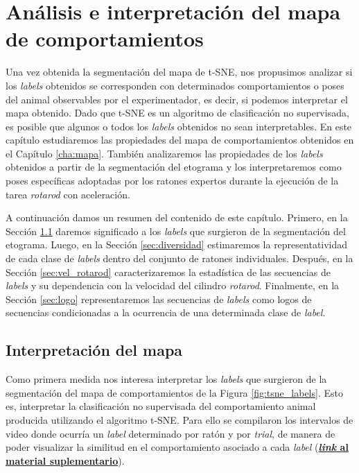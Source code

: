 \chapter{Análisis e interpretación del mapa de comportamientos}\label{cha:labels}

Una vez obtenida la segmentación del mapa de t-SNE, nos propusimos analizar si los \textit{labels} obtenidos se corresponden con determinados comportamientos o poses del animal observables por el experimentador, es decir, si podemos interpretar el mapa obtenido. Dado que t-SNE es un algoritmo de clasificación no supervisada, es posible que algunos o todos los \textit{labels} obtenidos no sean interpretables. En este capítulo estudiaremos las propiedades del mapa de comportamientos obtenidos en el Capítulo \ref{cha:mapa}. También analizaremos las propiedades de los \textit{labels} obtenidos a partir de la segmentación del etograma y los interpretaremos como poses específicas adoptadas por los ratones expertos durante la ejecución de la tarea \textit{rotarod} con aceleración.

A continuación damos un resumen del contenido de este capítulo. Primero, en la Sección \ref{sec:inter_labels} daremos significado a los \textit{labels} que surgieron de la segmentación del etograma. Luego, en la Sección \ref{sec:diversidad} estimaremos la representatividad de cada clase de \textit{labels} dentro del conjunto de ratones individuales. Después, en la Sección \ref{sec:vel_rotarod} caracterizaremos la estadística de las secuencias de \textit{labels} y su dependencia con la velocidad del cilindro \textit{rotarod}. Finalmente, en la Sección \ref{sec:logo} representaremos las secuencias de \textit{labels} como logos de secuencias condicionadas a la ocurrencia de una determinada clase de \textit{label}.

\section{Interpretación del mapa}\label{sec:inter_labels}

Como primera medida nos interesa interpretar los \textit{labels} que surgieron de la segmentación del mapa de comportamientos de la Figura \ref{fig:tsne_labels}. Esto es, interpretar la clasificación no supervisada del comportamiento animal producida utilizando el algoritmo t-SNE. Para ello se compilaron los intervalos de video donde ocurría un \textit{label} determinado por ratón y por \textit{trial}, de manera de poder visualizar la similitud en el comportamiento asociado a cada \textit{label} (\href{https://youtube.com/playlist?list=PLRCempM9WkGZvXhkziQ5Hk8FQTWqDjYet}{\textbf{\textit{link} al material suplementario}}).

